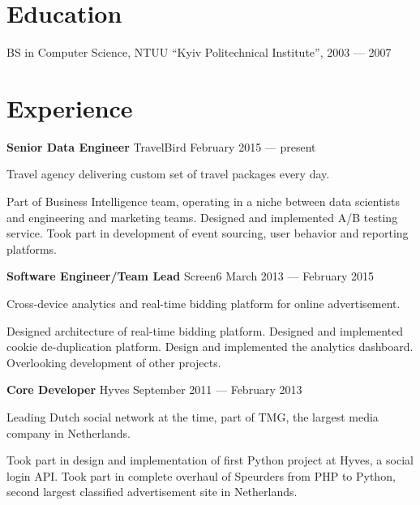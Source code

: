 \documentclass[margin]{res}
\begin{document}

\address{{\bf Mailing address} \\ Czaar Peterstraat 103B \\ 1018PE, Amsterdam, The Netherlands}

\address{{\bf Contacts} \\ +31 62 980 61 41 \\ contact@mishkovskyi.net \\ \href{https://github.com/mishok13}{mishok13@GitHub}}

\begin{resume}

\section{Education}
BS in Computer Science, NTUU ``Kyiv Politechnical Institute'', 2003 --- 2007

\section{Experience}

{\bf Senior Data Engineer} TravelBird \hfill February 2015 --- present

Travel agency delivering custom set of travel packages every day.

Part of Business Intelligence team, operating in a niche between data
scientists and engineering and marketing teams. Designed and
implemented A/B testing service. Took part in development of event
sourcing, user behavior and reporting platforms.

{\bf Software Engineer/Team Lead} Screen6 \hfill March 2013 --- February 2015

Cross-device analytics and real-time bidding platform for online
advertisement.

Designed architecture of real-time bidding platform. Designed and
implemented cookie de-duplication platform. Design and implemented the
analytics dashboard. Overlooking development of other projects.

{\bf Core Developer} Hyves \hfill September 2011 --- February 2013

Leading Dutch social network at the time, part of TMG, the largest
media company in Netherlands.

Took part in design and implementation of first Python project at
Hyves, a social login API. Took part in complete overhaul of Speurders
from PHP to Python, second largest classified advertisement site in
Netherlands.


\end{resume}
\end{document}
